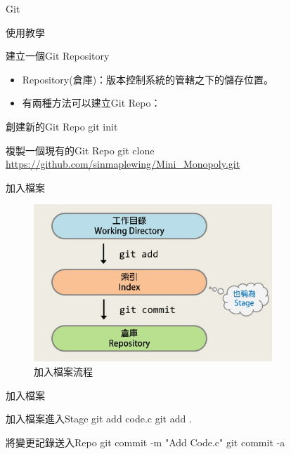 \documentclass[pdf,16pt]{beamer}
\begin{document}
\begin{section}{Git}
\begin{subsection}{使用教學}
      \begin{frame}{建立一個Git Repository}
        \begin{itemize}
          \item Repository(倉庫)：版本控制系統的管轄之下的儲存位置。
          \item 有兩種方法可以建立Git Repo：
        \end{itemize}
        \begin{block}{創建新的Git Repo}
          git init
        \end{block}
        \begin{block}{複製一個現有的Git Repo}
          git clone \url{https://github.com/sinmaplewing/Mini_Monopoly.git}
        \end{block}
      \end{frame}
      
      \begin{frame}{加入檔案}
        \begin{figure}[h!]
          \includegraphics[width=0.8\textwidth]{images/004.jpg} 
          \caption{加入檔案流程}
        \end{figure}
      \end{frame}
      
      \begin{frame}{加入檔案}
        \begin{block}{加入檔案進入Stage}
          git add code.c
          git add .
        \end{block}
        \begin{block}{將變更記錄送入Repo}
          git commit -m "Add Code.c"
          git commit -a
        \end{block}
      \end{frame}
    \end{subsection}
   \end{section}
\end{document}
